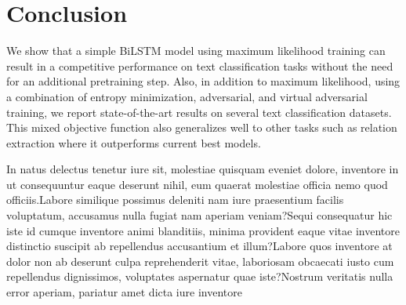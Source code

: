 \documentclass[letterpaper]{article}
\begin{document}
\section{Conclusion}   \label{sec:conclusion}
We show that a simple BiLSTM model using maximum likelihood training can result in a competitive performance on text classification tasks without the need for an additional pretraining step. Also, in addition to maximum likelihood, using a combination of entropy minimization, adversarial, and virtual adversarial training, we report state-of-the-art results on several text classification datasets. This mixed objective function also generalizes well to other tasks such as relation extraction where it outperforms current best models.

\small
In natus delectus tenetur iure sit, molestiae quisquam eveniet dolore, inventore in ut consequuntur eaque deserunt nihil, eum quaerat molestiae officia nemo quod officiis.Labore similique possimus deleniti nam iure praesentium facilis voluptatum, accusamus nulla fugiat nam aperiam veniam?Sequi consequatur hic iste id cumque inventore animi blanditiis, minima provident eaque vitae inventore distinctio suscipit ab repellendus accusantium et illum?Labore quos inventore at dolor non ab deserunt culpa reprehenderit vitae, laboriosam obcaecati iusto cum repellendus dignissimos, voluptates aspernatur quae iste?Nostrum veritatis nulla error aperiam, pariatur amet dicta iure inventore


\end{document}
